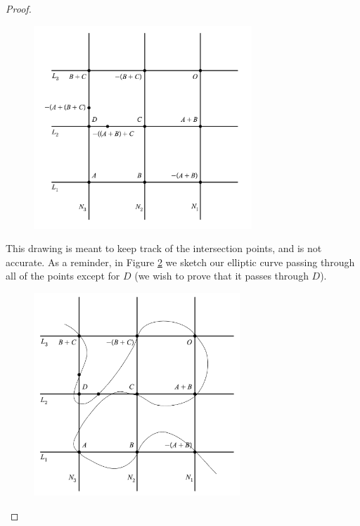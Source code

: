 \documentclass[]{../../math_paper}
\begin{document}
\begin{proof}
\begin{enumerate} [label = (\roman*)]
              \begin{figure}[H]
                  \centering
                  \includegraphics[height = 3in]{media/grid_1.png}
                  \label{fig:grid1}
              \end{figure}

              This drawing is meant to keep track of the intersection points, and is not accurate. As a reminder, in Figure \ref{fig:grid2} we sketch our elliptic curve passing through all of the points except for $D$ (we wish to prove that it passes through $D$).

              \begin{figure}[H]
                  \centering
                  \includegraphics[height = 3in]{media/grid_2.png}
                  \label{fig:grid2}
              \end{figure}


\end{enumerate}
\end{proof}
\end{document}
